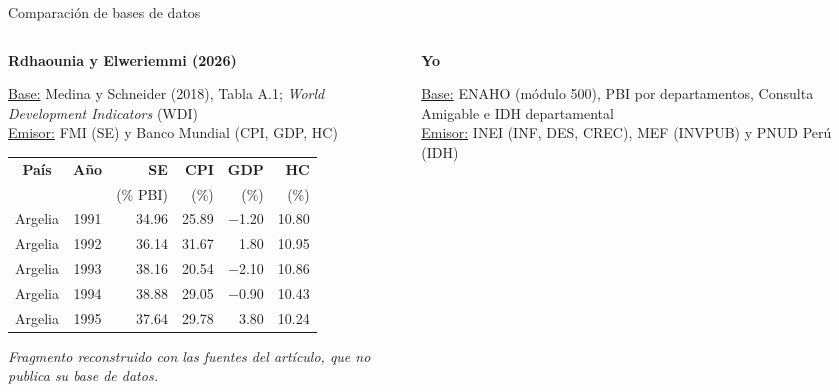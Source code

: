 \documentclass[serif, aspectratio=169]{beamer}
\begin{document}
\begin{frame}{Comparación de bases de datos}
\begin{columns}[T]
\begin{column}{0.44\textwidth}
\centering
\textbf{Rdhaounia y Elweriemmi (2026)}

\vspace{2pt}
\raggedright\scriptsize
\underline{Base:} Medina y Schneider (2018), Tabla A.1; \textit{World Development Indicators} (WDI)\\
\underline{Emisor:} FMI (SE) y Banco Mundial (CPI, GDP, HC)

\vspace{4pt}
\centering
{\scriptsize\setlength{\tabcolsep}{3pt}
\begin{tabular}{ccrrrr}
\toprule
\textbf{País} & \textbf{Año} & \textbf{SE} & \textbf{CPI} & \textbf{GDP} & \textbf{HC} \\
 & & (\% PBI) & (\%) & (\%) & (\%) \\
\midrule
Argelia & 1991 & 34.96 & 25.89 & $-$1.20 & 10.80 \\
Argelia & 1992 & 36.14 & 31.67 & 1.80 & 10.95 \\
Argelia & 1993 & 38.16 & 20.54 & $-$2.10 & 10.86 \\
Argelia & 1994 & 38.88 & 29.05 & $-$0.90 & 10.43 \\
Argelia & 1995 & 37.64 & 29.78 & 3.80 & 10.24 \\
\bottomrule
\end{tabular}}

\vspace{2pt}
\raggedright
{\tiny\itshape Fragmento reconstruido con las fuentes del artículo, que no publica su base de datos.}
\end{column}
\vrule
\begin{column}{0.54\textwidth}
\centering
\textbf{Yo}

\vspace{2pt}
\raggedright\scriptsize
\underline{Base:} ENAHO (módulo 500), PBI por departamentos, Consulta Amigable e IDH departamental\\
\underline{Emisor:} INEI (INF, DES, CREC), MEF (INVPUB) y PNUD Perú (IDH)


\end{column}
\end{columns}
\end{frame}
\end{document}
